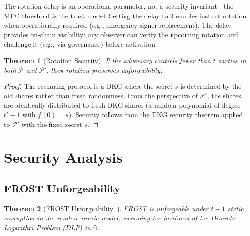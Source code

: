 \documentclass[11pt,twocolumn]{article}
\newtheorem{theorem}{Theorem}[section]
\begin{document}
The rotation delay is an operational parameter, not a security invariant---the MPC
threshold \emph{is} the trust model. Setting the delay to 0 enables instant rotation
when operationally required (e.g., emergency signer replacement). The delay provides
on-chain visibility: any observer can verify the upcoming rotation and challenge it
(e.g., via governance) before activation.

\begin{theorem}[Rotation Security]
\label{thm:rotation-sec}
If the adversary controls fewer than $t$ parties in both $\mathcal{P}$ and
$\mathcal{P}'$, then rotation preserves unforgeability.
\end{theorem}

\begin{proof}
The resharing protocol is a DKG where the secret $s$ is determined by the old shares
rather than fresh randomness. From the perspective of $\mathcal{P}'$, the shares are
identically distributed to fresh DKG shares (a random polynomial of degree $t'-1$ with
$f(0) = s$). Security follows from the DKG security theorem applied to $\mathcal{P}'$
with the fixed secret $s$.
\end{proof}

\section{Security Analysis}
\label{sec:security}

\subsection{FROST Unforgeability}

\begin{theorem}[FROST Unforgeability~\cite{komlo2020frost}]
\label{thm:frost-uf}
FROST is unforgeable under $t{-}1$ static corruption in the random oracle model,
assuming the hardness of the Discrete Logarithm Problem (DLP) in $\mathbb{G}$.
\end{theorem}
\end{document}
